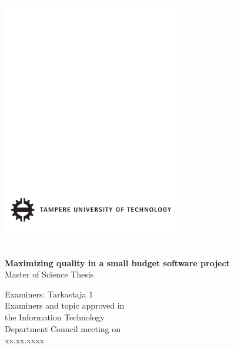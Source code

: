  
\thispagestyle{empty}
 
\vspace*{-.5cm}\noindent
 
 
\includegraphics[width=8cm]{tillbehor/tut-logo}
 
\vspace{6.8cm}
 
\\
{\bf\large \textsf{Maximizing quality in a small budget software project}}\\
\textsf{Master of Science Thesis}
 
\vspace{8.7cm} %
 
\begin{flushright}
  
\begin{minipage}[c]{6.8cm}
\begin{spacing}{1.0}
\textsf{Examiners: Tarkastaja 1}\\
\textsf{Examiners and topic approved in}\\ 
\textsf{the Information Technology}\\
\textsf{Department Council meeting on}\\
\textsf{xx.xx.xxxx}\\
\end{spacing}
\end{minipage}
\end{flushright}
 
